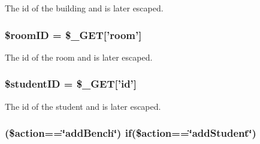 \-The id of the building and is later escaped. \hypertarget{back__checkRooms_8php_a61034568ba6e795a925d00afa98d3797}{
\subsubsection[{\$room\-I\-D}]{\setlength{\rightskip}{0pt plus 5cm}\$room\-I\-D = \$\-\_\-\-G\-E\-T\mbox{[}'room'\mbox{]}}}\label{back__checkRooms_8php_a61034568ba6e795a925d00afa98d3797}
\-The id of the room and is later escaped. \hypertarget{back__checkRooms_8php_af62eac6f1a6ea66c9f90093940147945}{
\subsubsection[{\$student\-I\-D}]{\setlength{\rightskip}{0pt plus 5cm}\$student\-I\-D = \$\-\_\-\-G\-E\-T\mbox{[}'id'\mbox{]}}}\label{back__checkRooms_8php_af62eac6f1a6ea66c9f90093940147945}
\-The id of the student and is later escaped. \hypertarget{back__checkRooms_8php_a8e6545ce0238da2ec377455ff693414e}{
\subsubsection[{if}]{ (\$action==\char`\"{}add\-Bench\char`\"{}) if(\$action==\char`\"{}add\-Student\char`\"{})}}\label{back__checkRooms_8php_a8e6545ce0238da2ec377455ff693414e}
